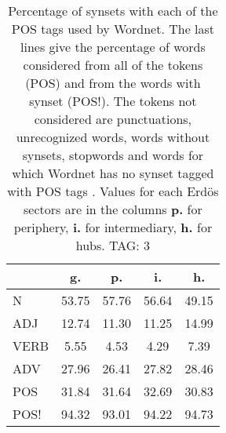 \begin{table}[h!]
\begin{center}
\begin{tabular}{| l || c | c | c | c |}\hline
 & {\bf g.} & {\bf p.} & {\bf i.} & {\bf h.} \\\hline\hline
N & 53.75  & 57.76  & 56.64  & 49.15 \\\hline
ADJ & 12.74  & 11.30  & 11.25  & 14.99 \\\hline
VERB & 5.55  & 4.53  & 4.29  & 7.39 \\\hline
ADV & 27.96  & 26.41  & 27.82  & 28.46 \\\hline\hline
POS & 31.84  & 31.64  & 32.69  & 30.83 \\\hline
POS! & 94.32  & 93.01  & 94.22  & 94.73 \\\hline
\end{tabular}
\caption{Percentage of synsets with each of the POS tags used by Wordnet. The last lines give the percentage of words considered from all of the tokens (POS) and from the words with synset (POS!). The tokens not considered are punctuations, unrecognized words, words without synsets, stopwords and words for which Wordnet has no synset  tagged with POS tags . Values for each Erd\"os sectors are in the columns {{\bf p.}} for periphery, {{\bf i.}} for intermediary, {{\bf h.}} for hubs. TAG: 3}
\end{center}
\end{table}